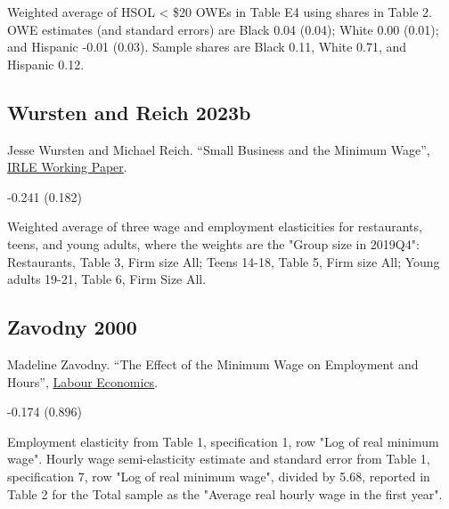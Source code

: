  Weighted average of HSOL < \$20 OWEs in Table E4 using shares in Table 2. OWE estimates (and standard errors) are Black 0.04 (0.04); White 0.00 (0.01); and Hispanic -0.01 (0.03). Sample shares are Black 0.11, White 0.71, and Hispanic 0.12.

\subsection*{Wursten and Reich 2023b}
\vspace{-0.7em}

\noindent Jesse Wursten and Michael Reich. ``Small Business and the Minimum Wage'', \href{https://irle.berkeley.edu/wp-content/uploads/2023/03/Small-Businesses-and-the-Minimum-Wage-3-14-23.pdf}{IRLE Working Paper}.

\vspace{0.7em}

 -0.241 (0.182)

\vspace{0.7em}

 Weighted average of three wage and employment elasticities for restaurants, teens, and young adults, where the weights are the "Group size in 2019Q4": Restaurants, Table 3, Firm size All; Teens 14-18, Table 5, Firm size All; Young adults 19-21, Table 6, Firm Size All.

\subsection*{Zavodny 2000}
\vspace{-0.7em}

\noindent Madeline Zavodny. ``The Effect of the Minimum Wage on Employment and Hours'', \href{https://doi.org/10.1016/S0927-5371(00)00021-X}{Labour Economics}.

\vspace{0.7em}

 -0.174 (0.896)

\vspace{0.7em}

 Employment elasticity from Table 1, specification 1, row "Log of real minimum wage". Hourly wage semi-elasticity estimate and standard error from Table 1, specification 7, row "Log of real minimum wage", divided by 5.68, reported in Table 2 for the Total sample as the "Average real hourly wage in the first year".

